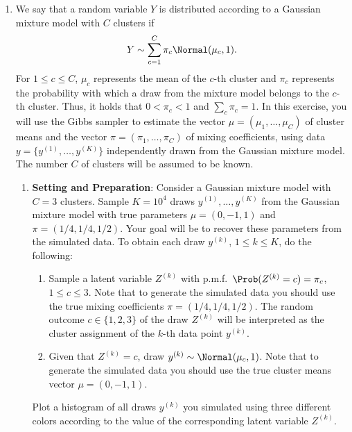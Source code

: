 \begin{enumerate}
\item[\textbf{5.5}] We say that a random variable $Y$ is distributed according to a Gaussian
  mixture model with $C$ clusters if
  \[
    Y \sim \sum_{c=1}^{C} \pi_c \Normal(\mu_c, 1).
  \]
  For $1 \le c \le C$, $\mu_c$ represents the mean of the $c$-th cluster and $\pi_c$
  represents the probability with which a draw from the mixture model belongs to the $c$-th
  cluster. Thus, it holds that $0 < \pi_c < 1$ and $\sum_c \pi_c = 1$. In this exercise, you
  will use the Gibbs sampler to estimate the vector $\mu = (\mu_1, \ldots, \mu_C)$ of cluster
  means and the vector $\pi = (\pi_1, \ldots, \pi_C)$ of mixing coefficients, using data
  $y = \{y^{(1)}, \ldots, y^{(K)}\}$ independently drawn from the Gaussian mixture model. The
  number $C$ of clusters will be assumed to be known.

  \begin{enumerate}
    \item \textbf{Setting and Preparation}: Consider a Gaussian mixture model with $C = 3$
      clusters. Sample $K = 10^4$ draws $y^{(1)}, \ldots, y^{(K)}$ from the Gaussian mixture
      model with true parameters $\mu = (0, -1, 1)$ and $\pi = (1/4, 1/4, 1/2)$. Your goal
      will be to recover these parameters from the simulated data. To obtain each draw
      $y^{(k)}$, $1 \le k \le K$, do the following:
      \begin{enumerate}[label=\alph*)]
        \item Sample a latent variable $Z^{(k)}$ with p.m.f.\ $\Prob(Z^{(k)} = c) = \pi_c$,
          $1 \le c \le 3$. Note that to generate the simulated data you should use the true
          mixing coefficients $\pi = (1/4, 1/4, 1/2)$. The random outcome $c \in \{1, 2, 3\}$
          of the draw $Z^{(k)}$ will be interpreted as the cluster assignment of the $k$-th
          data point $y^{(k)}$.

        \item Given that $Z^{(k)} = c$, draw $y^{(k)} \sim \Normal(\mu_c, 1)$. Note that to
          generate the simulated data you should use the true cluster means vector
          $\mu = (0, -1, 1)$.
      \end{enumerate}

      Plot a histogram of all draws $y^{(k)}$ you simulated using three different colors
      according to the value of the corresponding latent variable $Z^{(k)}$.


\end{enumerate}
\end{enumerate}
